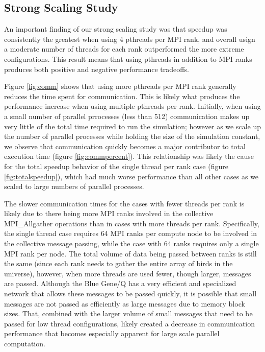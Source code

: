\subsection*{Strong Scaling Study}

An important finding of our strong scaling study was that speedup was consistently
the greatest when using 4 pthreads per MPI rank, and overall usign a moderate number of
threads for each rank outperformed the more extreme configurations. This result
means that using pthreads in addition to MPI ranks produces both positive and
negative performance tradeoffs.

Figure \ref{fig:comm} shows that using more pthreads per MPI rank generally
reduces the time spent for communication. This is likely what produces the performance
increase when using multiple pthreads per rank. Initially, when using a small
number of parallel prrocesses (less than 512) communication makes up very little
of the total time required to run the simulation; however as we scale up the
number of parallel processes while holding the size of the simulation constant,
we observe that communication quickly becomes a major contributor to total
execution time (figure \ref{fig:commpercent}). This relationship was likely the
cause for the total speedup behavior of the single thread per rank case (figure
\ref{fig:totalspeedup}), which had much worse performance than all other cases as we
scaled to large numbers of parallel processes.

The slower communication times for the cases with fewer threads per rank is
likely due to there being more MPI ranks involved in the collective MPI\_Allgather
operations than in cases with more threads per rank. Specifically, the single
thread case requires 64 MPI ranks per compute node to be involved in the collective
message passing, while the case with 64 ranks requires only a single MPI rank per
node. The total volume of data being passed between ranks is still the same
(since each rank needs to gather the entire array of birds in the universe),
however, when more threads are used fewer, though larger, messages are passed.
Although the Blue Gene/Q has a very efficient and specialized network that allows
these messages to be passed quickly, it is possible that small messages are not
passed as efficiently as large messages due to memory block sizes. That, combined
with the larger volume of small messages that need to be passed for low thread
configurations, likely created a decrease in communication performance that
becomes especially apparent for large scale parallel computation.

